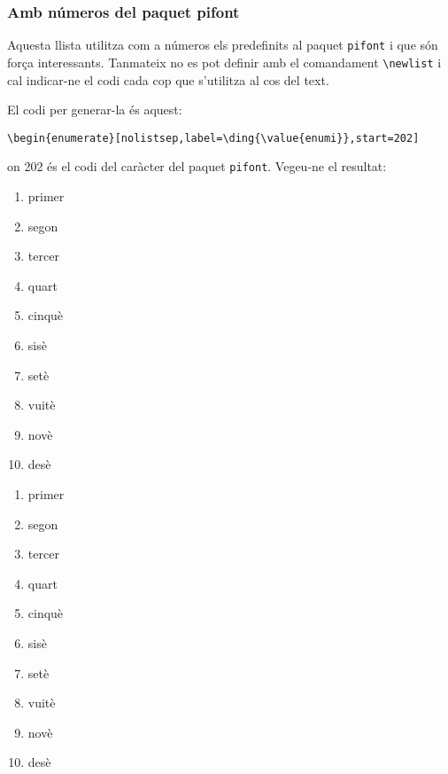 \documentclass[a4paper,%
                             twoside,%
                             BCOR1.0cm,%
                             DIV11,%
                             parskip=full,%
                             11pt]{scrbook}
\begin{document}
\subsubsection{Amb números del paquet pifont}\label{ssbsec:pifont}
Aquesta llista utilitza com a números els predefinits al paquet \verb+pifont+ i que són força interessants. Tanmateix no es pot definir amb el comandament \verb+\newlist+ i cal indicar-ne el codi cada cop que s'utilitza al cos del text.

El codi per generar-la és aquest:
\begin{scriptsize}
\begin{verbatim}
\begin{enumerate}[nolistsep,label=\ding{\value{enumi}},start=202]
\end{verbatim}
\end{scriptsize}
on 202 és el codi del caràcter del paquet \verb+pifont+. Vegeu-ne el resultat:


\begin{enumerate}[nolistsep,label=\ding{\value{enumi}},start=172]
\item  primer
\item segon
\item tercer
\item quart
\item cinquè
\item sisè
\item setè
\item vuitè
\item novè
\item desè
\end{enumerate}
\begin{enumerate}[nolistsep,label=\ding{\value{enumi}},start=182]
\item  primer
\item segon
\item tercer
\item quart
\item cinquè
\item sisè
\item setè
\item vuitè
\item novè
\item desè
\end{enumerate}
\end{document}
